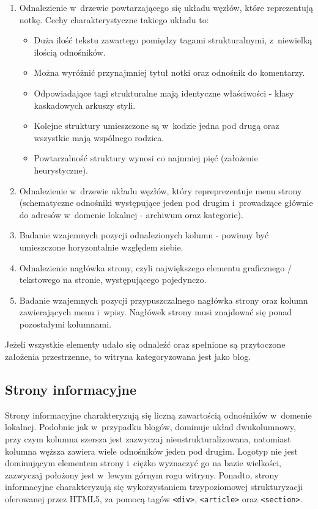 \documentclass[a4paper,10pt]{article}
\begin{document}
\begin{enumerate}
 \item Odnalezienie w~drzewie powtarzającego się układu węzłów, które reprezentują notkę. Cechy charakterystyczne takiego układu to:
    \begin{itemize}
     \item Duża ilość tekstu zawartego pomiędzy tagami strukturalnymi, z~niewielką ilością odnośników.
     \item Można wyróżnić przynajmniej tytuł notki oraz odnośnik do komentarzy.
     \item Odpowiadające tagi strukturalne mają identyczne właściwości - klasy kaskadowych arkuszy styli.
     \item Kolejne struktury umieszczone są w~kodzie jedna pod drugą oraz wszystkie mają wspólnego rodzica.
     \item Powtarzalność struktury wynosi co najmniej pięć (założenie heurystyczne).
    \end{itemize}
  \item Odnalezienie w~drzewie układu węzłów, który repreprezentuje menu strony (schematyczne odnośniki występujące jeden pod drugim i~prowadzące głównie do adresów w~domenie lokalnej - archiwum oraz kategorie).
  \item Badanie wzajemnych pozycji odnalezionych kolumn - powinny być umieszczone horyzontalnie względem siebie.
  \item Odnalezienie nagłówka strony, czyli największego elementu graficznego / tekstowego na stronie, występującego pojedynczo. 
  \item Badanie wzajemnych pozycji przypuszczalnego nagłówka strony oraz kolumn zawierających menu i~wpisy. Nagłówek strony musi znajdować się ponad pozostałymi kolumnami.
\end{enumerate}

\noindent Jeżeli wszystkie elementy udało się odnaleźć oraz spełnione są przytoczone założenia przestrzenne, to witryna kategoryzowana jest jako blog.

\subsection*{Strony informacyjne}

Strony informacyjne charakteryzują się liczną zawartością odnośników w~domenie lokalnej. Podobnie jak w~przypadku blogów, dominuje układ dwukolumnowy, przy czym kolumna szersza jest zazwyczaj nieustrukturalizowana, natomiast kolumna węższa zawiera wiele odnośników jeden pod drugim. Logotyp nie jest dominującym elementem strony i~ciężko wyznaczyć go na bazie wielkości, zazwyczaj położony jest w~lewym górnym rogu witryny. Ponadto, strony informacyjne charakteryzują się wykorzystaniem trzypoziomowej strukturyzacji oferowanej przez HTML5, za pomocą tagów \verb+<div>+, \verb+<article>+ oraz \verb+<section>+.
\end{document}
